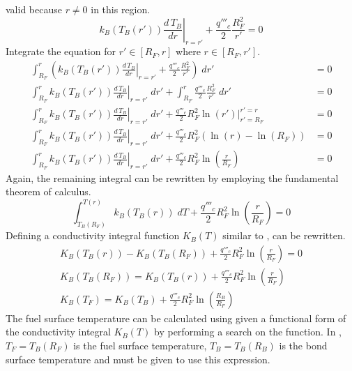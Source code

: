       valid because $r \ne 0$ in this region.
      \begin{equation}
        \left. k_B(T_B(r')) \frac{d\,T_B}{dr} \right|_{r=r'} + 
          \frac{q'''_c}{2} \frac{R_F^2}{r'} = 0
      \end{equation}
      Integrate the equation for $r' \in [R_F,r]$ where $r \in [R_F,r']$.
      \begin{align}
        \int_{R_F}^r \left( \left. k_B(T_B(r')) \frac{d\,T_B}{dr}\right|_{r=r'}
          + \frac{q'''_c}{2} \frac{R_F^2}{r'} \right) \; dr' &= 0 \\
        \int_{R_F}^r \left. k_B(T_B(r')) \frac{d\,T_B}{dr}\right|_{r=r'} \; dr'
          + \int_{R_F}^r \frac{q'''_c}{2} \frac{R_F^2}{r'} \; dr' &= 0\\
        \int_{R_F}^r \left. k_B(T_B(r')) \frac{d\,T_B}{dr}\right|_{r=r'} \; dr'
          + \frac{q'''_c}{2} R_F^2 \left. \ln(r') \right|_{r'=R_F}^{r'=r} &= 0\\
        \int_{R_F}^r \left. k_B(T_B(r')) \frac{d\,T_B}{dr}\right|_{r=r'} \; dr'
          + \frac{q'''_c}{2} R_F^2 ( \ln(r) - \ln(R_F)) &= 0 \\
        \int_{R_F}^r \left. k_B(T_B(r')) \frac{d\,T_B}{dr}\right|_{r=r'} \; dr'
          + \frac{q'''_c}{2} R_F^2 \ln\left(\frac{r}{R_F}\right) &= 0 
      \end{align}
      Again, the remaining integral can be rewritten by employing the
      fundamental theorem of calculus.
      \begin{equation}
        \label{eq:tf_fundamental_theorem}
        \int_{T_B(R_F)}^{T(r)} k_B(T_B(r)) \; dT + \frac{q'''_c}{2} R_F^2 
          \ln\left(\frac{r}{R_F}\right) = 0
      \end{equation}
      Defining a conductivity integral function $K_B(T)$ similar to
      ,  can be
      rewritten.
      \begin{gather}
        K_B(T_B(r)) - K_B(T_B(R_F)) + \frac{q'''_c}{2} R_F^2
          \ln\left(\frac{r}{R_F}\right) = 0 \\
        \label{eq:tbond_r}
        K_B(T_B(R_F)) = K_B(T_B(r)) + \frac{q'''_c}{2} R_F^2
          \ln\left(\frac{r}{R_F}\right) \\
        \label{eq:tf_conductivity_integral}
        K_B(T_F) = K_B(T_B) + \frac{q'''_c}{2} R_F^2
          \ln\left(\frac{R_B}{R_F}\right)
      \end{gather}
      The fuel surface temperature can be calculated using
       given a functional form of the
      conductivity integral $K_B(T)$ by performing a search on the function. In
      , $T_F=T_B(R_F)$ is the fuel surface 
      temperature, $T_B=T_B(R_B)$ is the bond surface temperature and must be
      given to use this expression.

